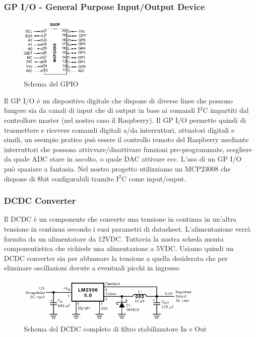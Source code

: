 \documentclass[10pt]{article}
\begin{document}
		\subsubsection{GP I/O - General Purpose Input/Output Device}\label{sec:gpio}
		\begin{figure}
		\vspace{-20pt}
			\centering
			\includegraphics[width=0.3\textwidth]{src/gpio_scheme}
			\caption{Schema del GPIO}\label{fig:gpio}
			\vspace{-10pt}
		\end{figure}
		Il GP I/O è un dispositivo digitale che dispone di diverse linee che possono fungere sia da canali di input che di output in base ai comandi I\(^2\)C impartiti dal controllore master (nel nostro caso il Raspberry). Il GP I/O permette quindi di trasmettere e ricevere comandi digitali a/da interruttori, attuatori digitali e simili, un esempio pratico può essere il controllo remoto del Raspberry mediante interruttori che possono attivvare/disattivare funzioni pre-programmate, scegliere da quale ADC stare in ascolto, o quale DAC attivare ecc. L'uso di un GP I/O può spaziare a fantasia. Nel nostro progetto utilizziamo un MCP23008 che dispone di 8bit configurabili tramite I\(^2\)C come input/ouput.



\newpage
		\subsubsection{DCDC Converter}\label{sec:dcdc}
		Il DCDC è un componente che converte una tensione in continua in un'altra tensione in continua secondo i suoi parametri di datasheet.
		L'alimentazione verrà formita da un alimentatore da 12VDC. Tuttavia la nostra scheda monta componentistica che richiede una alimentazione a 5VDC. Usiamo quindi un DCDC converter sia per abbassare la tensione a quella desiderata che per eliminare oscillazioni dovute a eventuali picchi in ingresso
		\begin{figure}[h]
			\centering
			\includegraphics[width=0.8\textwidth]{src/dcdc_scheme}
			\caption{Schema del DCDC completo di filtro stabilizzatore In e Out}\label{fig:dcdc}
		\end{figure}
\end{document}
